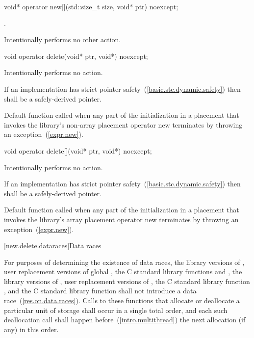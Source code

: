 %
\begin{itemdecl}
void* operator new[](std::size_t size, void* ptr) noexcept;
\end{itemdecl}

\begin{itemdescr}
\pnum
\returns
{}.

\pnum
\remarks
Intentionally performs no other action.
\end{itemdescr}

%
\begin{itemdecl}
void operator delete(void* ptr, void*) noexcept;
\end{itemdecl}

\begin{itemdescr}
\pnum
\effects
Intentionally performs no action.

\pnum
\requires
If an implementation has strict pointer safety~(\ref{basic.stc.dynamic.safety})
then  shall be a safely-derived pointer.

\pnum
\remarks
Default function called when any part of the initialization in a
placement  that invokes the library's
non-array placement operator new
terminates by throwing an exception~(\ref{expr.new}).
\end{itemdescr}

%
\begin{itemdecl}
void operator delete[](void* ptr, void*) noexcept;
\end{itemdecl}

\begin{itemdescr}
\pnum
\effects
Intentionally performs no action.

\pnum
\requires
If an implementation has strict pointer safety~(\ref{basic.stc.dynamic.safety})
then  shall be a safely-derived pointer.

\pnum
\remarks
Default function called when any part of the initialization in a
placement  that invokes the library's
array placement operator new
terminates by throwing an exception~(\ref{expr.new}).
\end{itemdescr}

[new.delete.dataraces]{Data races}

\pnum
For purposes of determining the existence of data races, the library versions
of , user replacement versions of global ,
the C standard library functions  and , the library
versions of , user replacement
versions of , the C standard library function
, and the C standard library function  shall not
introduce a data race~(\ref{res.on.data.races}).
Calls to these functions that allocate or deallocate a particular unit
of storage shall occur in a single total order, and each such deallocation call
shall happen before~(\ref{intro.multithread}) the next allocation (if any) in
this order.

